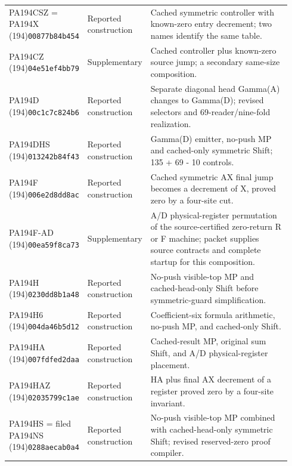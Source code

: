 \begin{longtable}{@{}p{0.24\linewidth}p{0.14\linewidth}p{0.56\linewidth}@{}}
PA194CSZ = PA194X (194)\newline\texttt{00877b84b454} & Reported construction & Cached symmetric controller with known-zero entry decrement; two names identify the same table.\\[4pt]
PA194CZ (194)\newline\texttt{04e51ef4bb79} & Supplementary & Cached controller plus known-zero source jump; a secondary same-size composition.\\[4pt]
PA194D (194)\newline\texttt{00c1c7c824b6} & Reported construction & Separate diagonal head Gamma(A) changes to Gamma(D); revised selectors and 69-reader/nine-fold realization.\\[4pt]
PA194DHS (194)\newline\texttt{013242b84f43} & Reported construction & Gamma(D) emitter, no-push MP and cached-only symmetric Shift; 135 + 69 - 10 controls.\\[4pt]
PA194F (194)\newline\texttt{006e2d8dd8ac} & Reported construction & Cached symmetric AX final jump becomes a decrement of X, proved zero by a four-site cut.\\[4pt]
PA194F-AD (194)\newline\texttt{00ea59f8ca73} & Supplementary & A/D physical-register permutation of the source-certified zero-return R or F machine; packet supplies source contracts and complete startup for this composition.\\[4pt]
PA194H (194)\newline\texttt{0230dd8b1a48} & Reported construction & No-push visible-top MP and cached-head-only Shift before symmetric-guard simplification.\\[4pt]
PA194H6 (194)\newline\texttt{004da46b5d12} & Reported construction & Coefficient-six formula arithmetic, no-push MP, and cached-only Shift.\\[4pt]
PA194HA (194)\newline\texttt{007fdfed2daa} & Reported construction & Cached-result MP, original sum Shift, and A/D physical-register placement.\\[4pt]
PA194HAZ (194)\newline\texttt{02035799c1ae} & Reported construction & HA plus final AX decrement of a register proved zero by a four-site invariant.\\[4pt]
PA194HS = filed PA194NS (194)\newline\texttt{0288aecab0a4} & Reported construction & No-push visible-top MP combined with cached-head-only symmetric Shift; revised reserved-zero proof compiler.\\[4pt]

\end{longtable}
